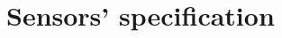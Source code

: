 \documentclass[tcc]{subfile}
\begin{document}
\chapter{Sensors' specification}
\label{app:instrumentation}

\end{document}
